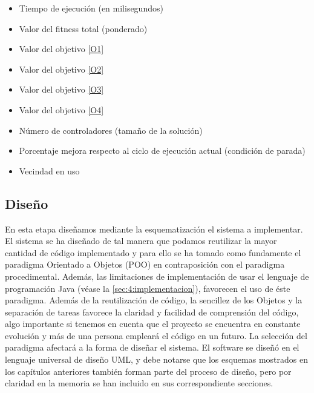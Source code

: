 \begin{enumerate}[label={\textbf{RIO\arabic*}}, ref={RIO\arabic*},  align=left]
\begin{enumerate}[label*={\textbf{.\arabic*}}]
\begin{itemize}
			\item Tiempo de ejecución (en milisegundos)
			\item Valor del fitness total (ponderado)
			\item Valor del objetivo \ref{O1}
			\item Valor del objetivo \ref{O2}
			\item Valor del objetivo \ref{O3}
			\item Valor del objetivo \ref{O4}
			\item Número de controladores (tamaño de la solución)
			\item Porcentaje mejora respecto al ciclo de ejecución actual (condición de parada)
			\item Vecindad en uso			
		\end{itemize}
	\end{enumerate}
\end{enumerate}


\subsection{Diseño}
\label{sec:4:diseño}

En esta etapa diseñamos mediante la esquematización el sistema a implementar. El sistema se ha diseñado de tal manera que podamos reutilizar la mayor cantidad de código implementado y para ello se ha tomado como fundamente el paradigma Orientado a Objetos (POO) en contraposición con el paradigma procedimental. Además, las limitaciones de implementación de usar el lenguaje de programación Java (véase la \autoref{sec:4:implementacion}), favorecen el uso de éste paradigma. Además de la reutilización de código, la sencillez de los Objetos y la separación de tareas favorece la claridad y facilidad de comprensión del código, algo importante si tenemos en cuenta que el proyecto se encuentra en constante evolución y más de una persona empleará el código en un futuro. La selección del paradigma afectará a la forma de diseñar el sistema. El software se diseñó en el lenguaje universal de diseño UML, y debe notarse que los esquemas mostrados en los capítulos anteriores también forman parte del proceso de diseño, pero por claridad en la memoria se han incluido en sus correspondiente secciones.

